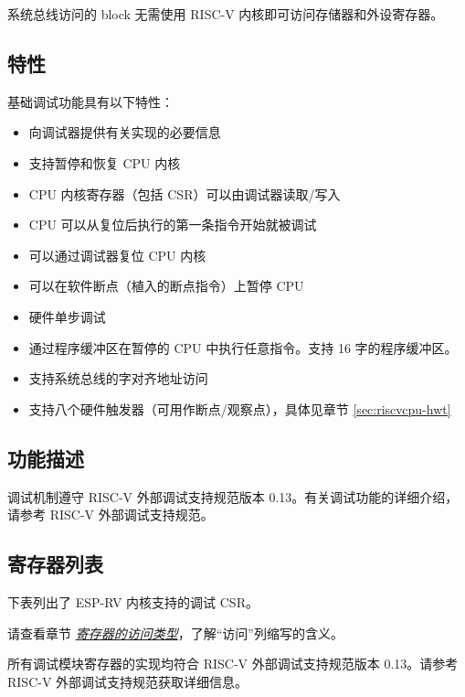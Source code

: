 \documentclass[main\_\_CN.tex]{subfiles}
\begin{document}
系统总线访问的 block 无需使用 RISC-V 内核即可访问存储器和外设寄存器。


\subsection{特性}
\label{sec:riscvcpu-dbg-features}
基础调试功能具有以下特性：

\begin{itemize}
    \item {向调试器提供有关实现的必要信息}
    \item {支持暂停和恢复 CPU 内核}
    \item {CPU 内核寄存器（包括 CSR）可以由调试器读取/写入}
    \item {CPU 可以从复位后执行的第一条指令开始就被调试}
    \item {可以通过调试器复位 CPU 内核}
    \item {可以在软件断点（植入的断点指令）上暂停 CPU}
    \item {硬件单步调试}
    \item {通过程序缓冲区在暂停的 CPU 中执行任意指令。支持 16 字的程序缓冲区。}
    \item {支持系统总线的字对齐地址访问}
    \item {支持八个硬件触发器（可用作断点/观察点），具体见章节 \ref{sec:riscvcpu-hwt}}
\end{itemize}

\subsection{功能描述}
\label{sec:riscvcpu-dbg-func-descr}

调试机制遵守 RISC-V 外部调试支持规范版本 0.13。有关调试功能的详细介绍，请参考 RISC-V 外部调试支持规范。


\hypertarget{riscvcpu-dbg-reg-summ}{}
\subsection{寄存器列表}
\label{sec:riscvcpu-dbg-reg-summ}


下表列出了 ESP-RV 内核支持的调试 CSR。

请查看章节 \hyperref[glossary-access-types]{\textit{寄存器的访问类型}}，了解“访问”列缩写的含义。



所有调试模块寄存器的实现均符合 RISC-V 外部调试支持规范版本 0.13。请参考 RISC-V 外部调试支持规范获取详细信息。
\end{document}

